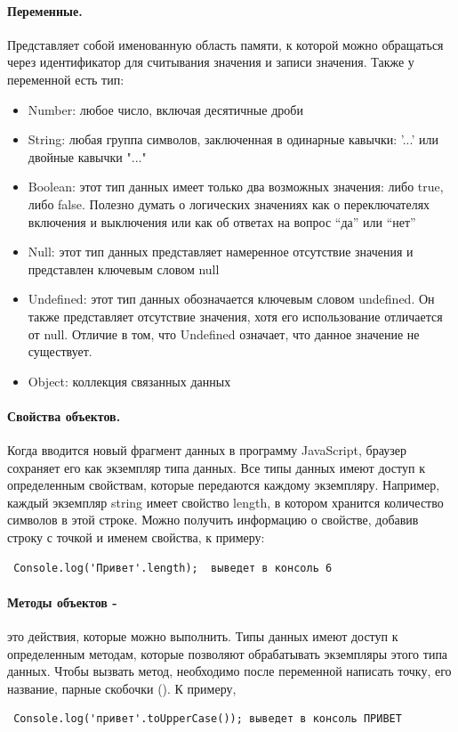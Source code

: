 \documentclass[14pt,Diplom]{diplomwork}
\begin{document}
\paragraph{Переменные.}
Представляет собой именованную область памяти, к которой можно обращаться через идентификатор для считывания значения
и записи значения. Также у переменной есть тип: 
 \begin{itemize}
	\item Number: любое число, включая десятичные дроби
	\item String: любая группа символов, заключенная в одинарные кавычки: '...' или двойные кавычки "..."
	\item Boolean: этот тип данных имеет только два возможных значения: либо true, либо false. Полезно думать о логических значениях как о переключателях включения и выключения или как об ответах на вопрос “да” или “нет”
	\item Null: этот тип данных представляет намеренное отсутствие значения и представлен ключевым словом null
	\item Undefined: этот тип данных обозначается ключевым словом undefined. Он также представляет отсутствие значения, хотя его использование отличается от null. Отличие в том, что Undefined означает, что данное значение не существует.
	\item Object: коллекция связанных данных
\end{itemize}

\paragraph{Свойства объектов.}
 Когда вводится новый фрагмент данных в программу JavaScript, браузер сохраняет его как экземпляр типа данных. Все типы данных имеют доступ к определенным свойствам, которые передаются каждому экземпляру. Например, каждый экземпляр string имеет свойство length, в котором хранится количество символов в этой строке. Можно получить информацию о свойстве, добавив строку с точкой и именем свойства, к примеру: 
 \begin{verbatim} Console.log('Привет'.length);  выведет в консоль 6 \end{verbatim} 

\paragraph{Методы объектов -}
это действия, которые можно выполнить. Типы данных имеют доступ к определенным методам, которые позволяют обрабатывать экземпляры этого типа данных. Чтобы вызвать метод, необходимо после переменной написать точку, его название, парные скобочки (). К примеру, 
\begin{verbatim} Сonsole.log('привет'.toUpperCase()); выведет в консоль ПРИВЕТ \end{verbatim} 
\end{document}
